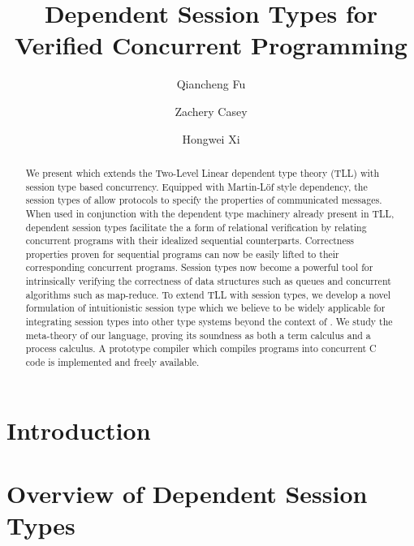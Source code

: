 \documentclass[acmsmall,10pt,anonymous]{acmart}
\begin{document}
\title{Dependent Session Types for Verified Concurrent Programming}

\author{Qiancheng Fu}

\author{Zachery Casey}

\author{Hongwei Xi}

\begin{abstract}
We present \TLLC{} which extends the Two-Level Linear dependent type theory
(TLL) with session type based concurrency. Equipped with Martin-L\"{o}f style
dependency, the session types of \TLLC{} allow protocols to specify the
properties of communicated messages. When used in conjunction with the dependent
type machinery already present in TLL, dependent session types facilitate the a
form of relational verification by relating concurrent programs with their
idealized sequential counterparts. Correctness properties proven for sequential
programs can now be easily lifted to their corresponding concurrent programs.
Session types now become a powerful tool for intrinsically verifying the
correctness of data structures such as queues and concurrent algorithms such as
map-reduce. To extend TLL with session types, we develop a novel formulation of
intuitionistic session type which we believe to be widely applicable for
integrating session types into other type systems beyond the context of \TLLC{}.
We study the meta-theory of our language, proving its soundness as both a term
calculus and a process calculus.
A prototype compiler which compiles \TLLC{} programs into concurrent C code is
implemented and freely available.
\end{abstract}

\maketitle

\section{Introduction}\label{sec:intro}


\section{Overview of Dependent Session Types}\label{sec:overview}

\end{document}
